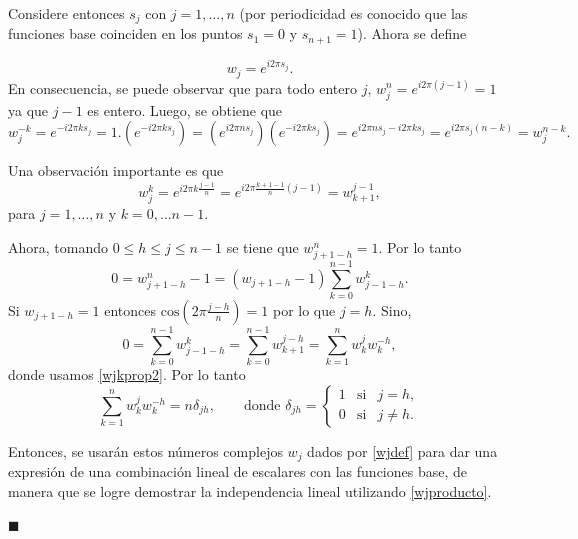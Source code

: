 \documentclass[a4paper,10pt]{book}
\newenvironment{dem}{\vspace*{-0.1cm}{\it Demostraci\'on:}}{\hfill
$\blacksquare$\\}
\begin{document}
\begin{dem}
Considere entonces $s_j$ con $j=1,\ldots,n$ (por periodicidad es conocido que las funciones base coinciden en los puntos $s_1=0$ y $s_{n+1}=1$). Ahora se define

\begin{equation}\label{wjdef}
    w_j=e^{i2\pi s_j}.
\end{equation}
En consecuencia, se puede observar que para todo entero $j$, $w_j^n=e^{i2\pi(j-1)}=1$ ya que $j-1$ es entero. Luego, se obtiene que 
\begin{equation}\label{wjprop1}
    w_j^{-k}=e^{-i2\pi ks_j}=1.(e^{-i2\pi ks_j})=(e^{i2\pi ns_j})(e^{-i2\pi ks_j})=e^{i2\pi ns_j-i2\pi ks_j}=e^{i2\pi s_j(n-k)}=w_j^{n-k}.
\end{equation}


Una observación importante es que 
\begin{equation}\label{wjkprop2}
    w_j^k=e^{i2\pi k\frac{j-1}{n}}=e^{i2\pi\frac{k+1-1}{n}(j-1)}=w_{k+1}^{j-1},
\end{equation}
para $j=1,\ldots,n$ y $k=0,\ldots n-1$.

Ahora, tomando $0\leq h\leq j\leq n-1$ se tiene que $w_{j+1-h}^n=1$. Por lo tanto
\[
 0=w_{j+1-h}^n-1=(w_{j+1-h}-1)\sum_{k=0}^{n-1}w_{j-1-h}^k.
\]
Si $w_{j+1-h}=1$ entonces $\mathrm{cos}(2\pi\frac{j-h}{n})=1$ por lo que $j=h$. Sino, 
\begin{equation}\label{wjproducto}
    0=\displaystyle\sum_{k=0}^{n-1}w_{j-1-h}^k=\displaystyle\sum_{k=0}^{n-1}w_{k+1}^{j-h}=\displaystyle\sum_{k=1}^{n}w_k^jw_k^{-h},
\end{equation}
donde usamos \eqref{wjkprop2}. Por lo tanto
\begin{equation}\label{wkproducto}
    \displaystyle\sum_{k=1}^{n}w_k^jw_k^{-h}=n\delta_{jh},\qquad \mbox{donde }
    \delta_{jh}=\left\{\begin{array}{lcl}
        1&\mbox{si}&j=h,  \\
        0&\mbox{si}&j\neq h.
    \end{array}\right.
\end{equation}

Entonces, se usarán estos números complejos $w_j$ dados por \eqref{wjdef} para dar una expresión de una combinación lineal de escalares con las funciones base, de manera que se logre demostrar la independencia lineal utilizando \eqref{wjproducto}.


\end{dem}
\end{document}
